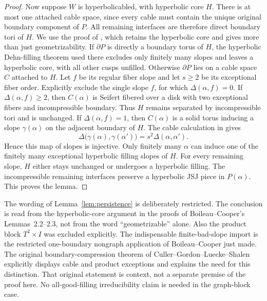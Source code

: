\documentclass[11pt]{article}
\begin{document}
\begin{proof}
Now suppose $W$ is hyperbolicabled, with hyperbolic core $H$.
There is at most one attached cable space, since every cable must
contain the unique original boundary component of $P$. All remaining
interfaces are therefore direct boundary tori of $H$.
We use the proof of \cite[Lemma~2.2, p.~50]{bc}, which retains the
hyperbolic core and gives more than just geometrizability.
If $\partial P$ is directly a boundary torus of $H$, the hyperbolic
Dehn-filling theorem used there excludes only finitely many slopes
and leaves a hyperbolic core, with all other cusps unfilled.
Otherwise $\partial P$ lies on a cable space $C$ attached to $H$.
Let $f$ be its regular fiber slope and let $s\ge2$ be its exceptional
fiber order. Explicitly exclude the single slope $f$, for which
$\Delta(\alpha,f)=0$.
If $\Delta(\alpha,f)\ge2$, then $C(\alpha)$ is Seifert fibered over a
disk with two exceptional fibers and incompressible boundary. Thus
$H$ remains separated by incompressible tori and is unchanged.
If $\Delta(\alpha,f)=1$, then $C(\alpha)$ is a solid torus inducing a
slope $\gamma(\alpha)$ on the adjacent boundary of $H$. The cable
calculation in \cite[proof of Lemma~2.2, p.~50]{bc} gives
\[
 \Delta\bigl(\gamma(\alpha),\gamma(\alpha')\bigr)
       =s^2\Delta(\alpha,\alpha').
\]
Hence this map of slopes is injective. Only finitely many $\alpha$
can induce one of the finitely many exceptional hyperbolic filling
slopes of $H$. For every remaining slope, $H$ either stays unchanged
or undergoes a hyperbolic filling. The incompressible remaining
interfaces preserve a hyperbolic JSJ piece in $P(\alpha)$.
This proves the lemma.
\end{proof}

The wording of Lemma~\ref{lem:persistence} is deliberately restricted.
The conclusion is read from the hyperbolic-core argument in the
proofs of Boileau--Cooper's Lemmas~2.2--2.3, not from the word
``geometrizable'' alone. Also the product block $T^2\times I$ was
excluded explicitly. The indispensable finite-bad-slope import is the restricted
one-boundary nongraph application of Boileau--Cooper just made.
The original boundary-compression theorem of Culler--Gordon--Luecke--Shalen
\cite[Theorem~2.4.4, printed p.~276]{cgls} explicitly displays cable
and product exceptions and explains the need for this distinction.
That original statement is context, not a separate premise of the
proof here. No all-good-filling irreducibility claim is needed in the
graph-block case.
\end{document}
